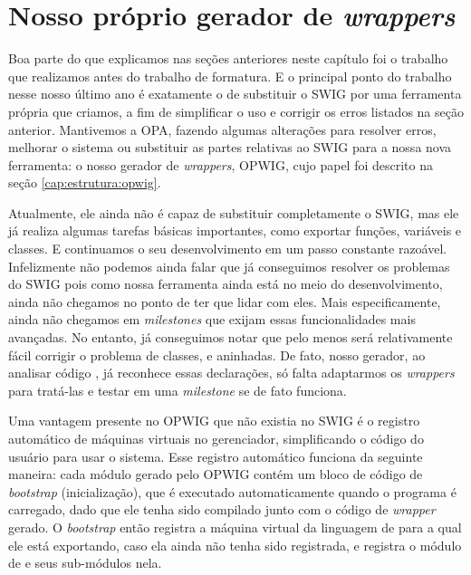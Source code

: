   \section{Nosso próprio gerador de \emph{wrappers}}
  \label{sec:actividads:opwig}
  Boa parte do que explicamos nas seções anteriores neste capítulo foi o trabalho que realizamos
  antes do trabalho de formatura. E o principal ponto do trabalho nesse nosso último ano é
  exatamente o de substituir o SWIG por uma ferramenta própria que criamos, a fim de
  simplificar o uso e corrigir os erros listados na seção anterior. Mantivemos a OPA,
  fazendo algumas alterações para resolver erros, melhorar o sistema ou substituir as
  partes relativas ao SWIG para a nossa nova ferramenta: o nosso gerador de
  \textit{wrappers}, OPWIG, cujo papel foi descrito na seção \ref{cap:estrutura:opwig}.
  
  Atualmente, ele ainda não é capaz de substituir completamente o SWIG, mas ele já realiza algumas
  tarefas básicas importantes, como exportar funções, variáveis e classes. E continuamos
  o seu desenvolvimento em um passo constante razoável. Infelizmente não podemos ainda falar que
  já conseguimos resolver os problemas do SWIG pois como nossa ferramenta ainda está no meio
  do desenvolvimento, ainda não chegamos no ponto de ter que lidar com eles. Mais
  especificamente, ainda não chegamos em \textit{milestones} que exijam essas funcionalidades
  mais avançadas. No entanto, já conseguimos notar que pelo menos será relativamente fácil
  corrigir o problema de classes,  e  aninhadas. De fato, nosso
  gerador, ao analisar código \CXX{}, já reconhece essas declarações, só falta adaptarmos
  os \textit{wrappers} para tratá-las e testar em uma \textit{milestone} se de fato funciona.
  
  Uma vantagem presente no OPWIG que não existia no SWIG é o registro automático
  de máquinas virtuais no gerenciador, simplificando o código do usuário para usar o sistema. Esse
  registro automático funciona da seguinte maneira: cada módulo gerado pelo OPWIG contém um bloco
  de código de \textit{bootstrap} (inicialização), que é executado automaticamente
  quando o programa é carregado, dado que ele tenha sido compilado junto com o código
  de \textit{wrapper} gerado. O \textit{bootstrap} então registra a máquina virtual da
  linguagem de \script{} para a qual ele está exportando, caso ela ainda não tenha sido
  registrada, e registra o módulo de \script{} e seus sub-módulos nela.
  
